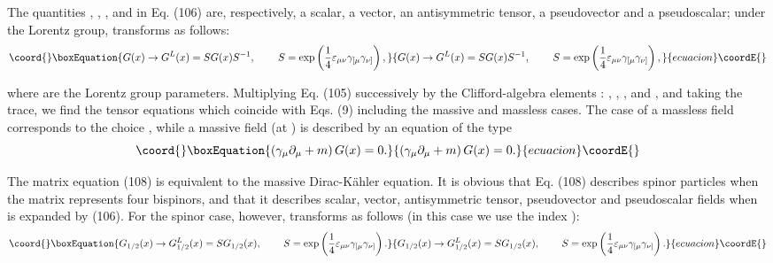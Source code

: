 \documentclass[a4paper,12pt]{article}
\begin{document}
The quantities \coordHE{}, \coordHE{}, \coordHE{}  \coordHE{}, and \coordHE{}
in Eq. (106) are, respectively, a scalar, a vector, an
antisymmetric tensor, a pseudovector and a pseudoscalar; under the
Lorentz group, \coordHE{} transforms as follows:
\begin{equation}\coord{}\boxEquation{
G(x)\rightarrow G^L(x)=SG(x)S^{-1} ,\hspace{0.3in}S=\exp \left(
\frac 14\varepsilon _{\mu \nu }\gamma _{[\mu }\gamma _{\nu
]}\right)  , \label{107}
}{
G(x)\rightarrow G^L(x)=SG(x)S^{-1} ,\hspace{0.3in}S=\exp \left(
\frac 14\varepsilon _{\mu \nu }\gamma _{[\mu }\gamma _{\nu
]}\right)  , }{ecuacion}\coordE{}\end{equation}

where \myHighlight{$\varepsilon _{\mu \nu }$}\coordHE{} are the Lorentz group parameters.
Multiplying Eq. (105) successively by the Clifford-algebra
elements \coordHE{}: \coordHE{}, \myHighlight{$ \gamma _\mu $}\coordHE{}, \coordHE{}, \coordHE{} and \coordHE{}, and
taking the trace, we find the tensor equations which coincide with
Eqs. (9) including the massive and massless cases. The case of a
massless field corresponds to the choice \coordHE{}, while a massive
field (at \coordHE{}) is described by an equation of the type
\begin{equation}\coord{}\boxEquation{
\left( \gamma _\mu \partial _\mu +m\right) G(x)=0  .\label{108}
}{
\left( \gamma _\mu \partial _\mu +m\right) G(x)=0  .}{ecuacion}\coordE{}\end{equation}

The matrix equation (108) is equivalent to the massive
Dirac-K\"ahler equation. It is obvious that Eq. (108) describes
spinor particles when the \coordHE{}matrix \coordHE{} represents
four bispinors, and that it describes scalar, vector,
antisymmetric tensor, pseudovector and pseudoscalar fields when
\coordHE{} is expanded by (106). For the spinor case, however, \coordHE{}
transforms as follows (in this case we use the index \coordHE{}):
\begin{equation}\coord{}\boxEquation{
G_{1/2}(x)\rightarrow G_{1/2}^L(x)=SG_{1/2}(x) ,
\hspace{0.3in}S=\exp \left( \frac 14\varepsilon _{\mu \nu }\gamma
_{[\mu }\gamma _{\nu ]}\right) .  \label{109}
}{
G_{1/2}(x)\rightarrow G_{1/2}^L(x)=SG_{1/2}(x) ,
\hspace{0.3in}S=\exp \left( \frac 14\varepsilon _{\mu \nu }\gamma
_{[\mu }\gamma _{\nu ]}\right) .  }{ecuacion}\coordE{}\end{equation}
\end{document}
